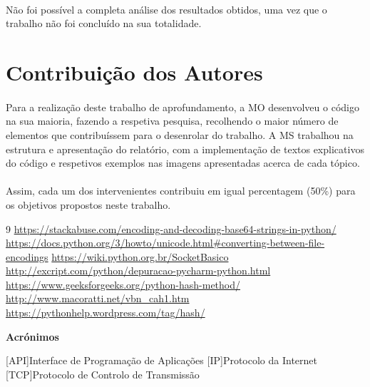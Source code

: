 \documentclass[a4paper,11pt,onecolumn,oneside]{article}
\begin{document}
\paragraph{ }
Não foi possível a completa análise dos resultados obtidos, uma vez que o trabalho não foi concluído na sua totalidade.


\newpage

{\center \section{Contribuição dos Autores}}
\paragraph{ }
Para a realização deste trabalho de aprofundamento, a MO desenvolveu o código na sua maioria, fazendo a respetiva pesquisa, recolhendo o maior número de elementos que contribuíssem para o desenrolar do trabalho. A MS trabalhou na estrutura e apresentação do relatório, com a implementação de textos explicativos do código e respetivos exemplos nas imagens apresentadas acerca de cada tópico. 
\paragraph{ }
Assim, cada um dos intervenientes contribuiu em igual percentagem (50\%) para os objetivos propostos neste trabalho.

\newpage
\center \begin{thebibliography} {9}
\url{https://stackabuse.com/encoding-and-decoding-base64-strings-in-python/}
\url{https://docs.python.org/3/howto/unicode.html#converting-between-file-encodings}
\url{https://wiki.python.org.br/SocketBasico}
\url{http://excript.com/python/depuracao-pycharm-python.html}
\url{https://www.geeksforgeeks.org/python-hash-method/}
\url{http://www.macoratti.net/vbn_cah1.htm}
\url{https://pythonhelp.wordpress.com/tag/hash/}

\end{thebibliography}

\newpage

{\huge \textbf{Acrónimos} \centering }

\begin{acronym}
[API]{Interface de Programação de Aplicações}
[IP]{Protocolo da Internet}
[TCP]{Protocolo de Controlo de Transmissão}
\end{acronym}
\end{document}
